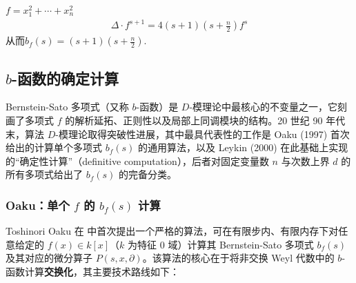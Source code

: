 \begin{example}[二次型]
    $f=x_1^2 + \cdots + x_n^2$
    \begin{equation*}
        \begin{aligned}
            \Delta \cdot f^{s+1} = 4(s+1)(s+\frac{n}{2})f^{s}
        \end{aligned}
    \end{equation*}
    从而$b_f(s)=(s+1)(s+\frac{n}{2})$.

\end{example}






\subsection{$b$-函数的确定计算}

Bernstein-Sato 多项式（又称 \(b\)-函数）是 \(D\)-模理论中最核心的不变量之一，它刻画了多项式 \(f\) 的解析延拓、正则性以及局部上同调模块的结构。20 世纪 90 年代末，算法 \(D\)-模理论取得突破性进展，其中最具代表性的工作是 Oaku (1997) 首次给出的计算单个多项式 \(b_f(s)\) 的通用算法，以及 Leykin (2000) 在此基础上实现的“确定性计算”（definitive computation），后者对固定变量数 \(n\) 与次数上界 \(d\) 的所有多项式给出了 \(b_f(s)\) 的完备分类。


\subsubsection{Oaku：单个 \(f\) 的 \(b_f(s)\) 计算}
Toshinori Oaku 在 \cite{oaku1997algorithm} 中首次提出一个严格的算法，可在有限步内、有限内存下对任意给定的 \(f(x)\in k[x]\)（\(k\) 为特征 0 域）计算其 Bernstein-Sato 多项式 \(b_f(s)\) 及其对应的微分算子 \(P(s,x,\partial)\)。该算法的核心在于将非交换 Weyl 代数中的 \(b\)-函数计算\textbf{交换化}，其主要技术路线如下：


